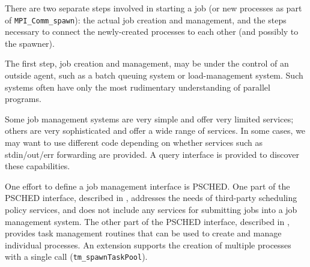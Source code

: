 \documentclass{article}
\let\code=\texttt
\begin{document}
There are two separate steps involved in starting a job (or new processes as
part of \code{MPI\_Comm\_spawn}): the actual job creation and management, and
the steps necessary to connect the newly-created processes to each other (and
possibly to the spawner).  

The first step, job creation and management, may be under the control of an
outside agent, such as a batch queuing system or load-management system.  Such
systems often have only the most rudimentary understanding of parallel
programs.

Some job management systems are very simple and offer very limited
services; others are very sophisticated and offer a wide range of services.
In some cases, we may want to use different code depending on whether services
such as stdin/out/err forwarding are provided.  A query interface is provided
to discover these capabilities.

One effort to define a job management interface is PSCHED.
One part of the PSCHED interface, described in \cite{psched01}, addresses the
needs of third-party scheduling 
policy services, and does not include any services for submitting jobs into a
job management system.  
The other part of the PSCHED interface, described in \cite{psched01other},
provides task management routines that can be used to create and manage
individual processes.  An extension supports the creation of multiple
processes with a single call (\code{tm\_spawnTaskPool}).  
\end{document}
